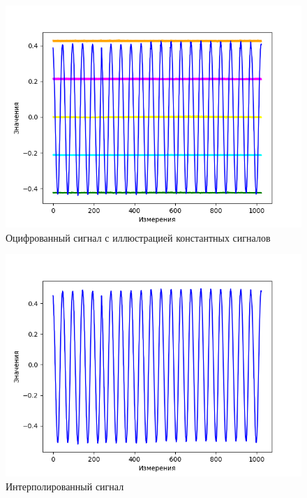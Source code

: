 \documentclass[12pt,a4paper]{article}
\begin{document}
\begin{figure}[H]
    \centering
    \includegraphics[scale=0.8]{images/signal_in_levels.png}
    \caption{Оцифрованный сигнал с иллюстрацией константных сигналов}
\end{figure}

\begin{figure}[H]
    \centering
    \includegraphics[scale=0.8]{images/interpolation.png}
    \caption{Интерполированный сигнал}
\end{figure}
\end{document}
